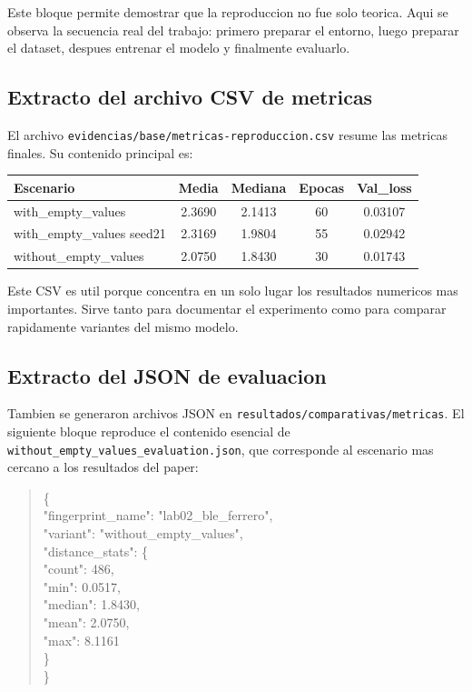\documentclass[11pt,a4paper]{article}
\begin{document}
Este bloque permite demostrar que la reproduccion no fue solo teorica. Aqui se observa la secuencia real del trabajo: primero preparar el entorno, luego preparar el dataset, despues entrenar el modelo y finalmente evaluarlo.

\subsection*{Extracto del archivo CSV de metricas}
El archivo \texttt{evidencias/base/metricas-reproduccion.csv} resume las metricas finales. Su contenido principal es:

\begin{center}
\begin{tabular}{>{\raggedright\arraybackslash}p{4.1cm}cccc}
\toprule
Escenario & Media & Mediana & Epocas & Val\_loss \\
\midrule
with\_empty\_values & 2.3690 & 2.1413 & 60 & 0.03107 \\
with\_empty\_values seed21 & 2.3169 & 1.9804 & 55 & 0.02942 \\
without\_empty\_values & 2.0750 & 1.8430 & 30 & 0.01743 \\
\bottomrule
\end{tabular}
\end{center}

Este CSV es util porque concentra en un solo lugar los resultados numericos mas importantes. Sirve tanto para documentar el experimento como para comparar rapidamente variantes del mismo modelo.

\subsection*{Extracto del JSON de evaluacion}
Tambien se generaron archivos JSON en \texttt{resultados/comparativas/metricas}. El siguiente bloque reproduce el contenido esencial de \texttt{without\_empty\_values\_evaluation.json}, que corresponde al escenario mas cercano a los resultados del paper:

\begin{quote}
\ttfamily\footnotesize
\{\\
"fingerprint\_name": "lab02\_ble\_ferrero",\\
"variant": "without\_empty\_values",\\
"distance\_stats": \{\\
\hspace*{1em}"count": 486,\\
\hspace*{1em}"min": 0.0517,\\
\hspace*{1em}"median": 1.8430,\\
\hspace*{1em}"mean": 2.0750,\\
\hspace*{1em}"max": 8.1161\\
\}\\
\}
\end{quote}
\end{document}
